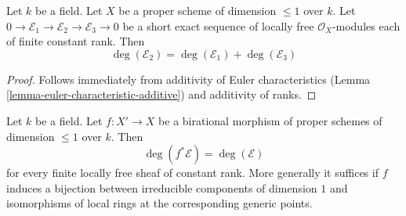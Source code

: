 \begin{lemma}
\label{lemma-degree-additive}
Let $k$ be a field. Let $X$ be a proper scheme of dimension $\leq 1$
over $k$. Let $0 \to \mathcal{E}_1 \to \mathcal{E}_2 \to \mathcal{E}_3 \to 0$
be a short exact sequence of locally free $\mathcal{O}_X$-modules
each of finite constant rank. Then
$$
\deg(\mathcal{E}_2) = \deg(\mathcal{E}_1) + \deg(\mathcal{E}_3)
$$
\end{lemma}

\begin{proof}
Follows immediately from additivity of Euler characteristics
(Lemma \ref{lemma-euler-characteristic-additive})
and additivity of ranks.
\end{proof}

\begin{lemma}
\label{lemma-degree-birational-pullback}
Let $k$ be a field. Let $f : X' \to X$ be a birational morphism of
proper schemes of dimension $\leq 1$ over $k$. Then
$$
\deg(f^*\mathcal{E}) = \deg(\mathcal{E})
$$
for every finite locally free sheaf of constant rank. More generally
it suffices if $f$ induces a bijection between irreducible components
of dimension $1$ and isomorphisms of local rings at the corresponding
generic points.
\end{lemma}

